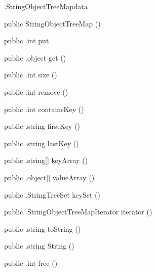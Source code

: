 \begin{CrexxClass}{.StringObjectTreeMap}{data}

  \begin{Hierarchy}
  \end{Hierarchy}

  \begin{Members}

    \Factory
      {public}
      {StringObjectTreeMap}
      {()}

    \Method
      {public}
      {.int}
      {put}
      {}

    \Method
      {public}
      {.object}
      {get}
      {()}

    \Method
      {public}
      {.int}
      {size}
      {()}

    \Method
      {public}
      {.int}
      {remove}
      {()}

    \Method
      {public}
      {.int}
      {containsKey}
      {()}

    \Method
      {public}
      {.string}
      {firstKey}
      {()}

    \Method
      {public}
      {.string}
      {lastKey}
      {()}

    \Method
      {public}
      {.string[]}
      {keyArray}
      {()}

    \Method
      {public}
      {.object[]}
      {valueArray}
      {()}

    \Method
      {public}
      {.StringTreeSet}
      {keySet}
      {()}

    \Method
      {public}
      {.StringObjectTreeMapIterator}
      {iterator}
      {()}

    \Method
      {public}
      {.string}
      {toString}
      {()}

    \Method
      {public}
      {.string}
      {String}
      {()}

    \Method
      {public}
      {.int}
      {free}
      {()}

  \end{Members}
\end{CrexxClass}

